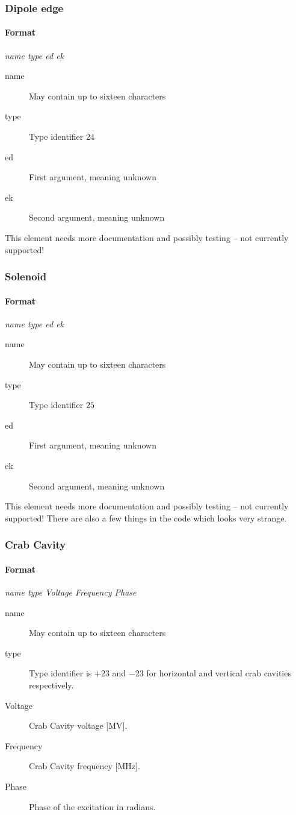 \documentclass[a4paper,11pt]{report}
\begin{document}
\subsubsection{Dipole edge}
\paragraph{Format} {\em name type ed ek}
\begin{description}
\item[name] May contain up to sixteen characters
\item[type] Type identifier $24$
\item[ed] First argument, meaning unknown
\item[ek] Second argument, meaning unknown
\end{description}

This element needs more documentation and possibly testing -- not currently supported!

\subsubsection{Solenoid}
\paragraph{Format} {\em name type ed ek}
\begin{description}
\item[name] May contain up to sixteen characters
\item[type] Type identifier $25$
\item[ed] First argument, meaning unknown
\item[ek] Second argument, meaning unknown
\end{description}

This element needs more documentation and possibly testing -- not currently supported! There are also a few things in the code which looks very strange.

\subsubsection{Crab Cavity} \label{CrabCav}

\paragraph{Format} {\em name type Voltage Frequency Phase}
\begin{description}
\item [name] May contain up to sixteen characters
\item [type] Type identifier is $+23$ and $-23$ for horizontal and vertical
  crab cavities respectively.
\item [Voltage] Crab Cavity voltage [MV].
\item [Frequency] Crab Cavity frequency [MHz]. 
\item [Phase] Phase of the excitation in radians.
\end{description}
\end{document}

